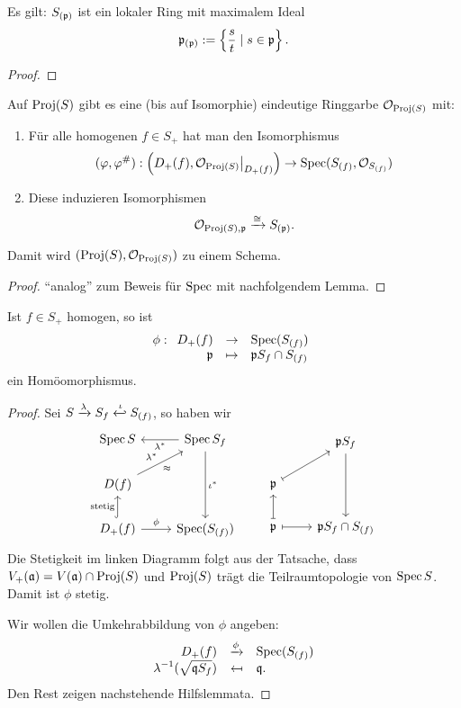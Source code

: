 \begin{lemma}
	Es gilt:
	$S_{(\mathfrak{p})}$ ist ein lokaler Ring mit maximalem Ideal 
	\[
		\mathfrak{p}_{(\mathfrak{p})} := \left\{\frac s t \mid s\in \mathfrak{p}\right\}.
	\]
\end{lemma}
\begin{proof}
    \TODO
\end{proof}

\begin{satz}
    \label{satz:proj s eindeutige ringgarbe}
	Auf $\operatorname{Proj}(S)$ gibt es eine (bis auf Isomorphie) eindeutige Ringgarbe
	$\mathcal{O}_{\operatorname{Proj}(S)}$ mit:
	\begin{enumerate}
	  \item Für alle homogenen $f\in S_+$ hat man den Isomorphismus
	  	\[
	  		(\varphi, \varphi^{\#}): 
	  			\left(D_+(f), \mathcal{O}_{\operatorname{Proj}(S)}\big|_{D_+(f)}\right)
	  			\to 
	  			\operatorname{Spec}(S_{(f)}, \mathcal{O}_{S_{(f)}})
	  	\]
	  \item
	  	Diese induzieren Isomorphismen
	  	\[
	  		\mathcal{O}_{\operatorname{Proj}(S), \mathfrak{p}} \xrightarrow\cong S_{(\mathfrak{p})}.
	  	\]
	\end{enumerate}
	Damit wird $(\operatorname{Proj}(S), \mathcal{O}_{\operatorname{Proj}(S)})$ zu einem Schema.
\end{satz}
\begin{proof}
"`analog"' zum Beweis für $\operatorname{Spec}$ mit nachfolgendem Lemma.
\end{proof}

\begin{lemma}
	Ist $f\in S_+$ homogen, so ist
	\[
		\phi: \funcdef{D_+(f) & \to & \Spec(S_{(f)}) \\
			\p & \mapsto & \p S_f \cap S_{(f)}}
	\]
	ein Homöomorphismus.
\end{lemma}
\begin{proof}
	\newcommand{\Sf}{S_{(f)}}
	Sei $S \xto \lambda S_f \xhookleftarrow\iota \Sf$, so haben wir
	\[\begin{tikzcd}
		\Spec S & \Spec S_f \lar{\lambda^\ast} \ar{dd}{\iota^\ast}
		\\
		D(f) \arrow{ur}{\lambda^\ast}[swap]{\approx}& \\
		D_+(f) \uar[hook]{\text{stetig}} \rar{\phi} & \Spec(\Sf)
	\end{tikzcd}\qquad
	\begin{tikzcd}[]
		& \p S_f \ar{dd}\\
		\p \urar[mapsto] & \\
		\p \uar[mapsto] \rar[mapsto] 
		& \p S_f \cap \Sf
	\end{tikzcd}
	\]
	Die Stetigkeit im linken Diagramm folgt aus der Tatsache, dass
	$V_+(\mathfrak{a}) = V(\mathfrak{a}) \cap \operatorname{Proj}(S)$ und $\operatorname{Proj}(S)$ trägt die Teilraumtopologie
	von $\operatorname{Spec} S$.
	Damit ist $\phi$ stetig.
	
	Wir wollen die Umkehrabbildung von $\phi$ angeben:
	\[
		\funcdef{D_+(f) & \xto\phi & \Spec(\Sf) \\
			\lambda\inv(\sqrt{\q S_f}) & \mapsfrom & \q.}
	\]
	Den Rest zeigen nachstehende Hilfslemmata. 
\end{proof}

